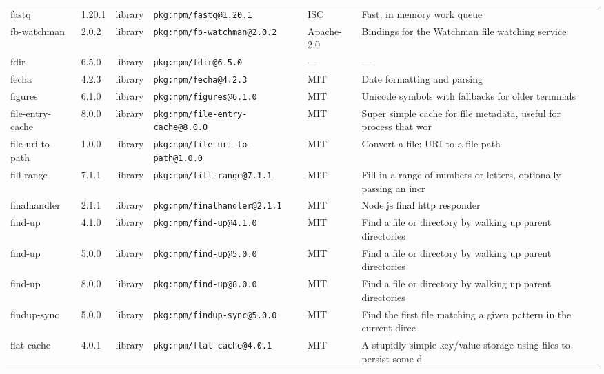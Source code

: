 \documentclass[11pt,a4paper]{article}
\begin{document}
\begin{longtable}{|p{4cm}|p{2cm}|p{1.6cm}|p{5cm}|p{1.5cm}|p{3.5cm}|}
\raggedright fastq & 1.20.1 & library & \small\texttt{pkg:npm/fastq@1.20.1} & ISC & \small Fast, in memory work queue \\
\raggedright fb-watchman & 2.0.2 & library & \small\texttt{pkg:npm/fb-watchman@2.0.2} & Apache-2.0 & \small Bindings for the Watchman file watching service \\
\raggedright fdir & 6.5.0 & library & \small\texttt{pkg:npm/fdir@6.5.0} & — & \small — \\
\raggedright fecha & 4.2.3 & library & \small\texttt{pkg:npm/fecha@4.2.3} & MIT & \small Date formatting and parsing \\
\raggedright figures & 6.1.0 & library & \small\texttt{pkg:npm/figures@6.1.0} & MIT & \small Unicode symbols with fallbacks for older terminals \\
\raggedright file-entry-cache & 8.0.0 & library & \small\texttt{pkg:npm/file-entry-cache@8.0.0} & MIT & \small Super simple cache for file metadata, useful for process that wor \\
\raggedright file-uri-to-path & 1.0.0 & library & \small\texttt{pkg:npm/file-uri-to-path@1.0.0} & MIT & \small Convert a file: URI to a file path \\
\raggedright fill-range & 7.1.1 & library & \small\texttt{pkg:npm/fill-range@7.1.1} & MIT & \small Fill in a range of numbers or letters, optionally passing an incr \\
\raggedright finalhandler & 2.1.1 & library & \small\texttt{pkg:npm/finalhandler@2.1.1} & MIT & \small Node.js final http responder \\
\raggedright find-up & 4.1.0 & library & \small\texttt{pkg:npm/find-up@4.1.0} & MIT & \small Find a file or directory by walking up parent directories \\
\raggedright find-up & 5.0.0 & library & \small\texttt{pkg:npm/find-up@5.0.0} & MIT & \small Find a file or directory by walking up parent directories \\
\raggedright find-up & 8.0.0 & library & \small\texttt{pkg:npm/find-up@8.0.0} & MIT & \small Find a file or directory by walking up parent directories \\
\raggedright findup-sync & 5.0.0 & library & \small\texttt{pkg:npm/findup-sync@5.0.0} & MIT & \small Find the first file matching a given pattern in the current direc \\
\raggedright flat-cache & 4.0.1 & library & \small\texttt{pkg:npm/flat-cache@4.0.1} & MIT & \small A stupidly simple key/value storage using files to persist some d \\

\end{longtable}
\end{document}
